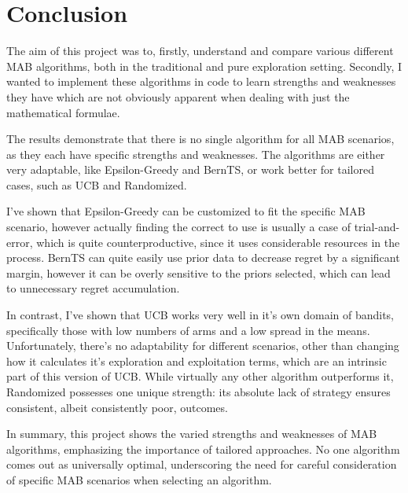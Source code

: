\chapter*{Conclusion}
\label{cha:conclusion} %

The aim of this project was to, firstly, understand and compare various different MAB algorithms, both in the traditional and pure exploration setting. Secondly, I wanted to implement these algorithms in code to learn strengths and weaknesses they have which are not obviously apparent when dealing with just the mathematical formulae.

The results demonstrate that there is no single algorithm for all MAB scenarios, as they each have specific strengths and weaknesses. The algorithms are either very adaptable, like Epsilon-Greedy and BernTS, or work better for tailored cases, such as UCB and Randomized.

I've shown that Epsilon-Greedy can be customized to fit the specific MAB scenario, however actually finding the correct \epsilonFunction \space to use is usually a case of trial-and-error, which is quite counterproductive, since it uses considerable resources in the process. BernTS can quite easily use prior data to decrease regret by a significant margin, however it can be overly sensitive to the priors selected, which can lead to unnecessary regret accumulation.

In contrast, I've shown that UCB works very well in it's own domain of bandits, specifically those with low numbers of arms and a low spread in the means. Unfortunately, there's no adaptability for different scenarios, other than changing how it calculates it's exploration and exploitation terms, which are an intrinsic part of this version of UCB. While virtually any other algorithm outperforms it, Randomized possesses one unique strength: its absolute lack of strategy ensures consistent, albeit consistently poor, outcomes.

In summary, this project shows the varied strengths and weaknesses of MAB algorithms, emphasizing the importance of tailored approaches. No one algorithm comes out as universally optimal, underscoring the need for careful consideration of specific MAB scenarios when selecting an algorithm.